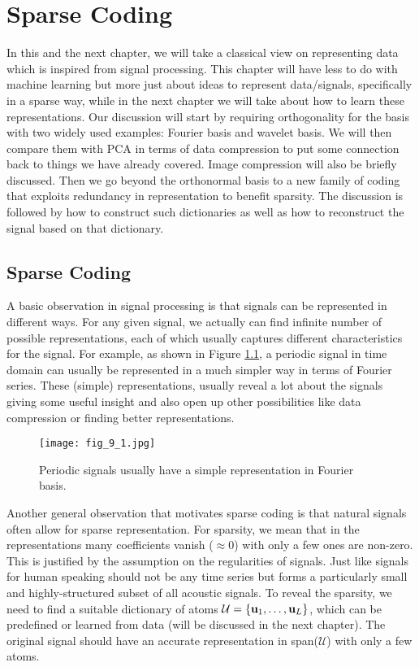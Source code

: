 \documentclass[../book-template.tex]{subfiles}
\begin{document}
\chapter{Sparse Coding}
In this and the next chapter, we will take a classical view on representing data which is inspired from signal processing. This chapter will have less to do with machine learning but more just about ideas to represent data/signals, specifically in a sparse way, while in the next chapter we will take about how to learn these representations. Our discussion will start by requiring orthogonality for the basis with two widely used examples: Fourier basis and wavelet basis. We will then compare them with PCA in terms of data compression to put some connection back to things we have already covered. Image compression will also be briefly discussed. Then we go beyond the orthonormal basis to a new family of coding that exploits redundancy in representation to benefit sparsity. The discussion is followed by how to construct such dictionaries as well as how to reconstruct the signal based on that dictionary.
\section{Sparse Coding}
A basic observation in signal processing is that signals can be represented in different ways. For any given signal, we actually can find infinite number of possible representations, each of which usually captures different characteristics for the signal. For example, as shown in Figure \ref{fig_9_1}, a periodic signal in time domain can usually be represented in a much simpler way in terms of Fourier series. These (simple) representations, usually reveal a lot about the signals giving some useful insight and also open up other possibilities like data compression or finding better representations. 
\begin{figure}[h] 
	\centering 
	\texttt{[image: fig\_9\_1.jpg]} 
	\caption{Periodic signals usually have a simple representation in Fourier basis.}\label{fig_9_1}
\end{figure}
\par Another general observation that motivates sparse coding is that natural signals often allow for sparse representation. For sparsity, we mean that in the representations many coefficients vanish ($\approx 0$) with only a few ones are non-zero. This is justified by the assumption on the regularities of signals. Just like signals for human speaking should not be any time series but forms a particularly small and highly-structured subset of all acoustic signals. To reveal the sparsity, we need to find a suitable dictionary of atoms $\mathcal{U}=\{{\bf u}_1,\dots,{\bf u}_L\}$, which can be predefined or learned from data (will be discussed in the next chapter). The original signal should have an accurate representation in span($\mathcal{U}$) with only a few atoms.
\end{document}
